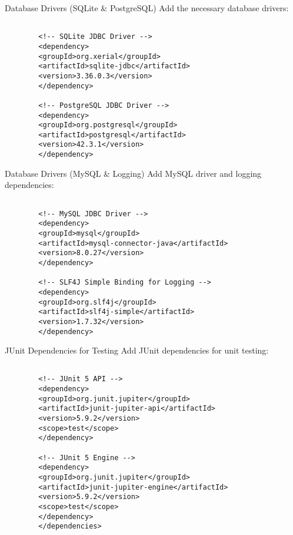 \documentclass[aspectratio=169, table]{beamer}
\begin{document}
\begin{frame}[fragile]{Database Drivers (SQLite \& PostgreSQL)}
	\vspace{20pt}
	Add the necessary database drivers:
	
	\begin{lstlisting}[style=XmlStyle]

		<!-- SQLite JDBC Driver -->
		<dependency>
		<groupId>org.xerial</groupId>
		<artifactId>sqlite-jdbc</artifactId>
		<version>3.36.0.3</version>
		</dependency>
		
		<!-- PostgreSQL JDBC Driver -->
		<dependency>
		<groupId>org.postgresql</groupId>
		<artifactId>postgresql</artifactId>
		<version>42.3.1</version>
		</dependency>

	\end{lstlisting}
\end{frame}

\begin{frame}[fragile]{Database Drivers (MySQL \& Logging)}
	\vspace{20pt}
	Add MySQL driver and logging dependencies:
	
	\begin{lstlisting}[style=XmlStyle]

		<!-- MySQL JDBC Driver -->
		<dependency>
		<groupId>mysql</groupId>
		<artifactId>mysql-connector-java</artifactId>
		<version>8.0.27</version>
		</dependency>
		
		<!-- SLF4J Simple Binding for Logging -->
		<dependency>
		<groupId>org.slf4j</groupId>
		<artifactId>slf4j-simple</artifactId>
		<version>1.7.32</version>
		</dependency>

	\end{lstlisting}
\end{frame}

\begin{frame}[fragile]{JUnit Dependencies for Testing}
	\vspace{20pt}
	Add JUnit dependencies for unit testing:
	
	\begin{lstlisting}[style=XmlStyle]

		<!-- JUnit 5 API -->
		<dependency>
		<groupId>org.junit.jupiter</groupId>
		<artifactId>junit-jupiter-api</artifactId>
		<version>5.9.2</version>
		<scope>test</scope>
		</dependency>
		
		<!-- JUnit 5 Engine -->
		<dependency>
		<groupId>org.junit.jupiter</groupId>
		<artifactId>junit-jupiter-engine</artifactId>
		<version>5.9.2</version>
		<scope>test</scope>
		</dependency>
		</dependencies>
	\end{lstlisting}
\end{frame}
\end{document}

